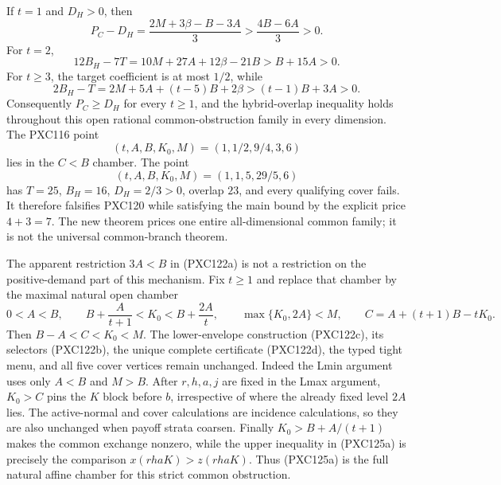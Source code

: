 \documentclass[11pt]{article}
\begin{document}
If \(t=1\) and \(D_H>0\), then
\[
 P_C-D_H=\frac{2M+3\beta-B-3A}{3}
          >\frac{4B-6A}{3}>0.                         \tag{PXC123b}
\]
For \(t=2\),
\[
 12B_H-7T=10M+27A+12\beta-21B>B+15A>0.               \tag{PXC123c}
\]
For \(t\ge3\), the target coefficient is at most \(1/2\), while
\[
 2B_H-T=2M+5A+(t-5)B+2\beta>(t-1)B+3A>0.             \tag{PXC123d}
\]
Consequently \(P_C\ge D_H\) for every \(t\ge1\), and the hybrid-overlap
inequality holds throughout this open rational common-obstruction family in
every dimension.  The PXC116 point
\[
 (t,A,B,K_0,M)=(1,1/2,9/4,3,6)
\]
lies in the \(C<B\) chamber.  The point
\[
 (t,A,B,K_0,M)=(1,1,5,29/5,6)                        \tag{PXC123e}
\]
has \(T=25\), \(B_H=16\), \(D_H=2/3>0\), overlap \(23\), and every
qualifying cover fails.  It therefore falsifies PXC120 while satisfying the
main bound by the explicit price \(4+3=7\).  The new theorem prices one
entire all-dimensional common family; it is not the universal common-branch
theorem.

The apparent restriction \(3A<B\) in (PXC122a) is not a restriction on the
positive-demand part of this mechanism.  Fix \(t\ge1\) and replace that
chamber by the maximal natural open chamber
\begin{equation}
 0<A<B,\qquad
 B+\frac{A}{t+1}<K_0<B+\frac{2A}{t},\qquad
 \max\{K_0,2A\}<M,\qquad
 C=A+(t+1)B-tK_0.                                  \tag{PXC125a}
\end{equation}
Then \(B-A<C<K_0<M\).  The lower-envelope construction (PXC122c), its
selectors (PXC122b), the unique complete certificate (PXC122d), the typed
tight menu, and all five cover vertices remain unchanged.  Indeed the Lmin
argument uses only \(A<B\) and \(M>B\).  After \(r,h,a,j\) are fixed in the
Lmax argument, \(K_0>C\) pins the \(K\) block before \(b\), irrespective of
where the already fixed level \(2A\) lies.  The active-normal and cover
calculations are incidence calculations, so they are also unchanged when
payoff strata coarsen.  Finally \(K_0>B+A/(t+1)\) makes the common exchange
nonzero, while the upper inequality in (PXC125a) is precisely the
comparison \(x(rhaK)>z(rhaK)\).  Thus (PXC125a) is the full natural affine
chamber for this strict common obstruction.
\end{document}
